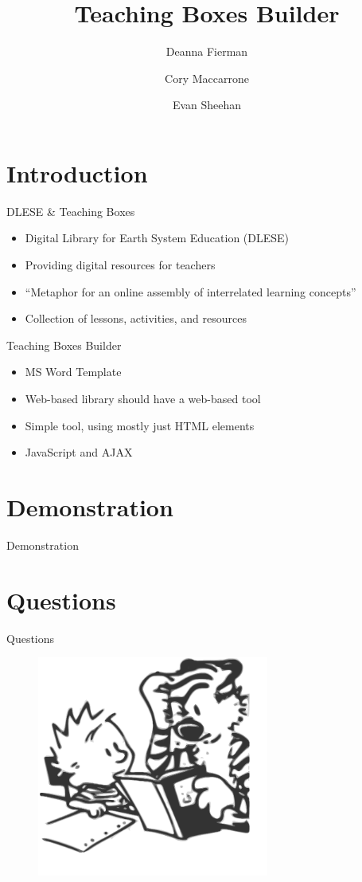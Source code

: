\documentclass[style=horatio,mode=present,paper=screen]{powerdot}
\title{Teaching Boxes Builder}
\author{
	Deanna Fierman
	\and
	Cory Maccarrone
	\and
	Evan Sheehan
}
\begin{document}
\maketitle

\section[slide=false]{Introduction}
\begin{slide}{DLESE \& Teaching Boxes}
\begin{itemize}
\item Digital Library for Earth System Education (DLESE)
\item Providing digital resources for teachers
\item ``Metaphor for an online assembly of interrelated learning concepts''
\item Collection of lessons, activities, and resources
\end{itemize}
\end{slide}

\begin{slide}{Teaching Boxes Builder}
\begin{itemize}
\item MS Word Template
\item Web-based library should have a web-based tool
\item Simple tool, using mostly just HTML elements
\item JavaScript and AJAX
\end{itemize}
\end{slide}

\section[slide=false]{Demonstration}
\begin{slide}[toc=,bm=]{Demonstration}
\end{slide}

\section[slide=false]{Questions}
\begin{slide}[toc=,bm=]{Questions}
\begin{figure}
\includegraphics[width=3in]{figures/calvin_and_hobbes}
\end{figure}
\end{slide}
\end{document}
